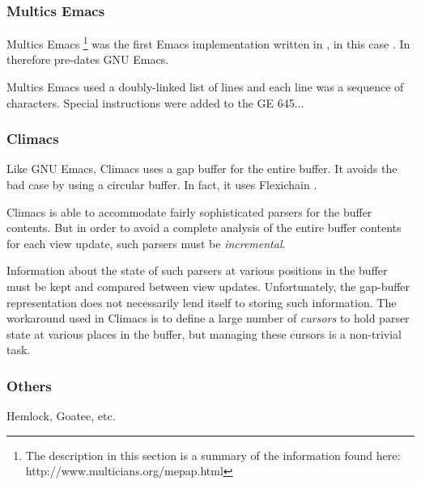 \subsubsection{Multics Emacs}

Multics Emacs%
\footnote{The description in this section is a summary of the
  information found here: http://www.multicians.org/mepap.html}
was the first Emacs implementation written in \lisp{}, in this case
\multics{} \maclisp{}.  In therefore pre-dates GNU Emacs.

Multics Emacs used a doubly-linked list of lines and each line was a
sequence of characters.  Special instructions were added to the GE
645...

\subsubsection{Climacs}

Like GNU Emacs, Climacs uses a gap buffer for the entire buffer.  It
avoids the bad case by using a circular buffer.  In fact, it uses
Flexichain \cite{flexichain}.

Climacs is able to accommodate fairly sophisticated parsers for the
buffer contents.  But in order to avoid a complete analysis of the
entire buffer contents for each view update, such parsers must be
\emph{incremental}.

Information about the state of such parsers at various positions in
the buffer must be kept and compared between view updates.
Unfortunately, the gap-buffer representation does not necessarily lend
itself to storing such information.  The workaround used in Climacs is
to define a large number of \emph{cursors} to hold parser state at
various places in the buffer, but managing these cursors is a
non-trivial task.

\subsubsection{Others}

Hemlock, Goatee, etc.

